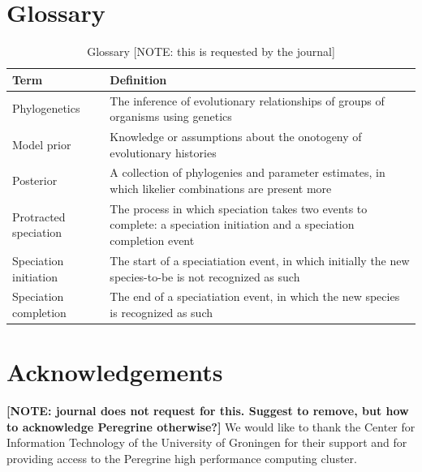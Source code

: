 \documentclass{article}
\begin{document}
\section{Glossary}
\begin{table}
  \centering 
  \begin{tabular}{l p{}}
    \hline
    Term                  & Definition \\
    \hline
    \hline
    Phylogenetics         & The inference of evolutionary relationships of groups of organisms using genetics \\
    Model prior           & Knowledge or assumptions about the onotogeny of evolutionary histories \\
    Posterior             & A collection of phylogenies and parameter estimates, in which likelier combinations are present more \\
    Protracted speciation & The process in which speciation takes two events to complete: a speciation initiation and a speciation completion event  \\
    Speciation initiation & The start of a speciatiation event, in which initially the new species-to-be is not recognized as such \\
    Speciation completion & The end of a speciatiation event, in which the new species is recognized as such \\
    \hline
  \end{tabular}
  \caption{
    Glossary [NOTE: this is requested by the journal]
  }
  \label{table:glossary}
\end{table}


\section{Acknowledgements}

\textbf{[NOTE: journal does not request for this. Suggest to remove, but how to acknowledge Peregrine otherwise?]}
We would like to thank the Center for Information Technology of the University of Groningen for their support
and for providing access to the Peregrine high performance computing cluster.
\end{document}
